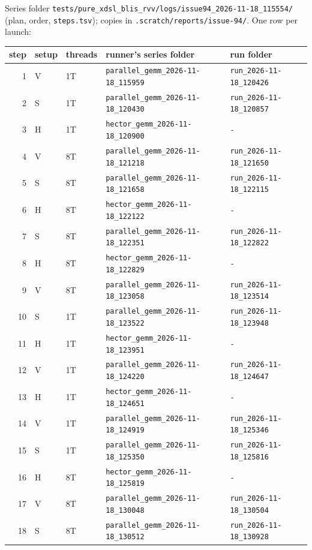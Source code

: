 Series folder \texttt{tests/pure\_xdsl\_blis\_rvv/logs/issue94\_2026-11-18\_115554/} (plan, order, \texttt{steps.tsv}); copies in \texttt{.scratch/reports/issue-94/}. One row per launch:
{\footnotesize\begin{longtable}{@{}rllll@{}}\toprule step & setup & threads & runner's series folder & run folder \\ \midrule
1 & V & 1T & \texttt{parallel\_gemm\_2026-11-18\_115959} & \texttt{run\_2026-11-18\_120426} \\
2 & S & 1T & \texttt{parallel\_gemm\_2026-11-18\_120430} & \texttt{run\_2026-11-18\_120857} \\
3 & H & 1T & \texttt{hector\_gemm\_2026-11-18\_120900} & \texttt{-} \\
4 & V & 8T & \texttt{parallel\_gemm\_2026-11-18\_121218} & \texttt{run\_2026-11-18\_121650} \\
5 & S & 8T & \texttt{parallel\_gemm\_2026-11-18\_121658} & \texttt{run\_2026-11-18\_122115} \\
6 & H & 8T & \texttt{hector\_gemm\_2026-11-18\_122122} & \texttt{-} \\
7 & S & 8T & \texttt{parallel\_gemm\_2026-11-18\_122351} & \texttt{run\_2026-11-18\_122822} \\
8 & H & 8T & \texttt{hector\_gemm\_2026-11-18\_122829} & \texttt{-} \\
9 & V & 8T & \texttt{parallel\_gemm\_2026-11-18\_123058} & \texttt{run\_2026-11-18\_123514} \\
10 & S & 1T & \texttt{parallel\_gemm\_2026-11-18\_123522} & \texttt{run\_2026-11-18\_123948} \\
11 & H & 1T & \texttt{hector\_gemm\_2026-11-18\_123951} & \texttt{-} \\
12 & V & 1T & \texttt{parallel\_gemm\_2026-11-18\_124220} & \texttt{run\_2026-11-18\_124647} \\
13 & H & 1T & \texttt{hector\_gemm\_2026-11-18\_124651} & \texttt{-} \\
14 & V & 1T & \texttt{parallel\_gemm\_2026-11-18\_124919} & \texttt{run\_2026-11-18\_125346} \\
15 & S & 1T & \texttt{parallel\_gemm\_2026-11-18\_125350} & \texttt{run\_2026-11-18\_125816} \\
16 & H & 8T & \texttt{hector\_gemm\_2026-11-18\_125819} & \texttt{-} \\
17 & V & 8T & \texttt{parallel\_gemm\_2026-11-18\_130048} & \texttt{run\_2026-11-18\_130504} \\
18 & S & 8T & \texttt{parallel\_gemm\_2026-11-18\_130512} & \texttt{run\_2026-11-18\_130928} \\
\bottomrule\end{longtable}}
